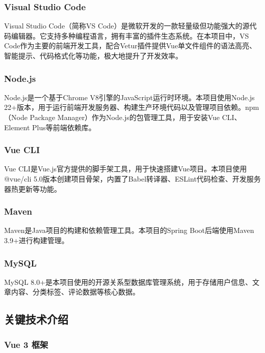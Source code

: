 \documentclass[12pt,a4paper]{article}
\begin{document}
\subsubsection{Visual Studio Code}

Visual Studio Code（简称VS Code）是微软开发的一款轻量级但功能强大的源代码编辑器。它支持多种编程语言，拥有丰富的插件生态系统。在本项目中，VS Code作为主要的前端开发工具，配合Vetur插件提供Vue单文件组件的语法高亮、智能提示、代码格式化等功能，极大地提升了开发效率。

\subsubsection{Node.js}

Node.js是一个基于Chrome V8引擎的JavaScript运行时环境。本项目使用Node.js 22+版本，用于运行前端开发服务器、构建生产环境代码以及管理项目依赖。npm（Node Package Manager）作为Node.js的包管理工具，用于安装Vue CLI、Element Plus等前端依赖库。

\subsubsection{Vue CLI}

Vue CLI是Vue.js官方提供的脚手架工具，用于快速搭建Vue项目。本项目使用@vue/cli 5.0版本创建项目骨架，内置了Babel转译器、ESLint代码检查、开发服务器热更新等功能。

\subsubsection{Maven}

Maven是Java项目的构建和依赖管理工具。本项目的Spring Boot后端使用Maven 3.9+进行构建管理。

\subsubsection{MySQL}

MySQL 8.0+是本项目使用的开源关系型数据库管理系统，用于存储用户信息、文章内容、分类标签、评论数据等核心数据。

\subsection{关键技术介绍}

\subsubsection{Vue 3 框架}
\end{document}
